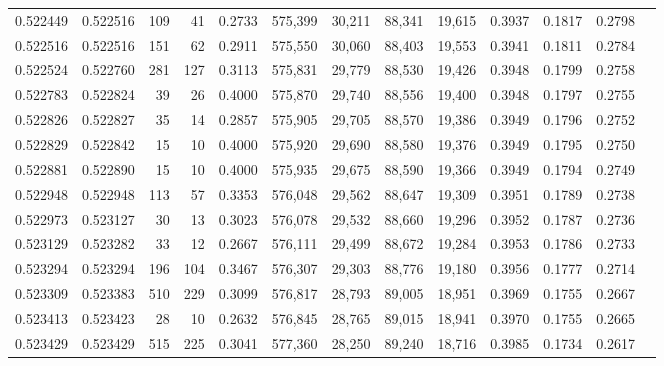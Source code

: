 \begin{tabular}{rrrrrrrrrrrrr}
0.522449 & 0.522516 &   109 &    41 &                                     0.2733 & 575,399 &  30,211 &  88,341 &  19,615 & 0.3937 & 0.1817 & 0.2798 \\
0.522516 & 0.522516 &   151 &    62 &                                     0.2911 & 575,550 &  30,060 &  88,403 &  19,553 & 0.3941 & 0.1811 & 0.2784 \\
0.522524 & 0.522760 &   281 &   127 &                                     0.3113 & 575,831 &  29,779 &  88,530 &  19,426 & 0.3948 & 0.1799 & 0.2758 \\
0.522783 & 0.522824 &    39 &    26 &                                     0.4000 & 575,870 &  29,740 &  88,556 &  19,400 & 0.3948 & 0.1797 & 0.2755 \\
0.522826 & 0.522827 &    35 &    14 &                                     0.2857 & 575,905 &  29,705 &  88,570 &  19,386 & 0.3949 & 0.1796 & 0.2752 \\
0.522829 & 0.522842 &    15 &    10 &                                     0.4000 & 575,920 &  29,690 &  88,580 &  19,376 & 0.3949 & 0.1795 & 0.2750 \\
0.522881 & 0.522890 &    15 &    10 &                                     0.4000 & 575,935 &  29,675 &  88,590 &  19,366 & 0.3949 & 0.1794 & 0.2749 \\
0.522948 & 0.522948 &   113 &    57 &                                     0.3353 & 576,048 &  29,562 &  88,647 &  19,309 & 0.3951 & 0.1789 & 0.2738 \\
0.522973 & 0.523127 &    30 &    13 &                                     0.3023 & 576,078 &  29,532 &  88,660 &  19,296 & 0.3952 & 0.1787 & 0.2736 \\
0.523129 & 0.523282 &    33 &    12 &                                     0.2667 & 576,111 &  29,499 &  88,672 &  19,284 & 0.3953 & 0.1786 & 0.2733 \\
0.523294 & 0.523294 &   196 &   104 &                                     0.3467 & 576,307 &  29,303 &  88,776 &  19,180 & 0.3956 & 0.1777 & 0.2714 \\
0.523309 & 0.523383 &   510 &   229 &                                     0.3099 & 576,817 &  28,793 &  89,005 &  18,951 & 0.3969 & 0.1755 & 0.2667 \\
0.523413 & 0.523423 &    28 &    10 &                                     0.2632 & 576,845 &  28,765 &  89,015 &  18,941 & 0.3970 & 0.1755 & 0.2665 \\
0.523429 & 0.523429 &   515 &   225 &                                     0.3041 & 577,360 &  28,250 &  89,240 &  18,716 & 0.3985 & 0.1734 & 0.2617 \\

\end{tabular}
